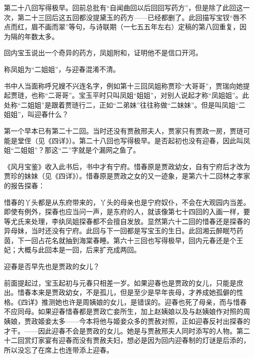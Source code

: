 \par 第二十八回写得极早。回前总批有“自闻曲回以后回回写药方”，但是除了此回这一次，第二十三回后这五回都没提黛玉的药方——已经都删了。此回描写宝钗“唇不点而红，眉不画而翠”等句，与诗联期（一七五五年左右）定稿的第八回重复，因为隔的年数太多。
\par 回内宝玉说出一个奇异的药方，凤姐附和，证明他不是信口开河。
\par 称凤姐为“二姐姐”，与迎春混淆不清。
\par 书中人当面称呼兄嫂不兴连名字，例如第十三回凤姐称贾珍“大哥哥”，贾瑞向她提起贾琏，也称“二哥哥”。宝玉平时只叫凤姐“姐姐”，对别人说起才称“凤姐姐”。此处称“二姐姐”是跟着贾琏行二，正如“二弟妹”往往称做“二妹妹”。但是叫凤姐“二姐姐”，叫迎春什么？
\par 第一个早本已有第二十二回。当时还没有贾赦邢夫人，贾家只有贾政一房，贾琏可能是堂侄（见《四详》）。第二十八回也写得极早。是否起初也没有迎春，因此叫凤姐“二姐姐”？那这“二”字就是个漏网之鱼了。
\par 《风月宝鉴》收入此书后，书中才有宁府。惜春原是贾政幼女，自有宁府后才改为贾珍的妹妹（见《四详》）。惜春原是贾政之女的又一迹象，是第六十二回林之孝家的报告探春：
\par 惜春的丫头都是从东府带来的，丫头的母亲也是宁府奴仆，不会在大观园内当差。即使有例外，探春也应当问一声，是东府的人，就该像第七十四回的入画一样，要等尤氏来处理，李纨凤姐探春都不会擅自发放。显然第六十二回的惜春还是探春的异母妹，当时还没有宁府。此回与下一回都是写宝玉的生日。此回湘云醉眠芍药茵，下一回占花名就抽到海棠春睡。第六十三回也写得极早，回内元春还是个王妃；大概与此回本是一回，后来扩充成两回。
\par 迎春是否早先也是贾政的女儿？
\par 前面提起过，宝玉起初与元春只相差一岁。如果迎春也是贾政的女儿，只能是庶出。惜春本来是贾政幼女，不是孤儿，但是至少是早年丧母，才养成她孤僻的性格。《四详》推测她也许是周姨娘的女儿，是错误的。迎春也死了母亲，而与惜春不应同母。如果迎春惜春都是贾政亡妾所生，加上赵姨娘以及与赵姨娘作对照的周姨娘，贾政姬妾太多——今本将他与姬妾众多的贾赦对照，正如迎春反衬出探春的才干。——因此迎春不会是贾政的女儿。她是与贾赦邢夫人同时添写的人物。第二十二回赏灯家宴有迎春而没有贾赦夫妇，想必是因为回内迎春制的灯谜是后添的，所以没忘了在席上也连带添上迎春。
